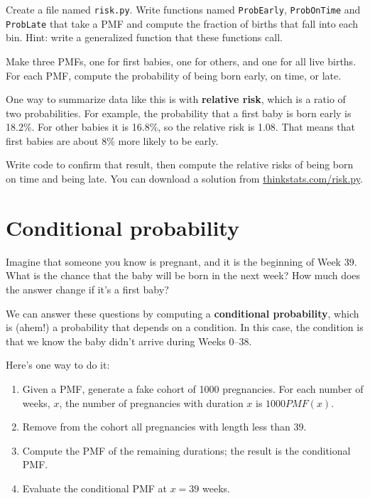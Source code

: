 \documentclass[12pt]{book}
\begin{document}
\begin{ex}

Create a file named {\tt risk.py}.
Write functions named {\tt ProbEarly}, {\tt ProbOnTime} and
{\tt ProbLate} that take a PMF and compute the fraction of births
that fall into each bin.  Hint: write a generalized function
that these functions call.

Make three PMFs, one for first babies, one for others, and one for
all live births.  For each PMF, compute the probability of being
born early, on time, or late.

One way to summarize data like this is with {\bf relative risk},
which is a ratio of two probabilities.  For example, the probability
that a first baby is born early is 18.2\%.  For other babies it is
16.8\%, so the relative risk is 1.08.  That means that first babies
are about 8\% more likely to be early.

Write code to confirm that result, then compute the relative risks of
being born on time and being late.  You can download a solution
from \url{thinkstats.com/risk.py}.

\end{ex}


\section{Conditional probability}

Imagine that someone you know is pregnant, and it is the beginning of
Week 39.  What is the chance that the baby will be born in the next
week?  How much does the answer change if it's a first baby?

We can answer these questions by computing a {\bf conditional
probability}, which is (ahem!) a probability that depends on a condition.
In this case, the condition is that we know the baby didn't arrive
during Weeks 0--38.

Here's one way to do it:

\begin{enumerate}


\item Given a PMF, generate a fake cohort of 1000 pregnancies.
For each number of weeks, $x$, the number of pregnancies with
duration $x$ is $1000 PMF(x)$.

\item Remove from the cohort all pregnancies with length less than 39.


\item Compute the PMF of the remaining durations; the result is the
conditional PMF.

\item Evaluate the conditional PMF at $x = 39$ weeks.

\end{enumerate}
\end{document}
